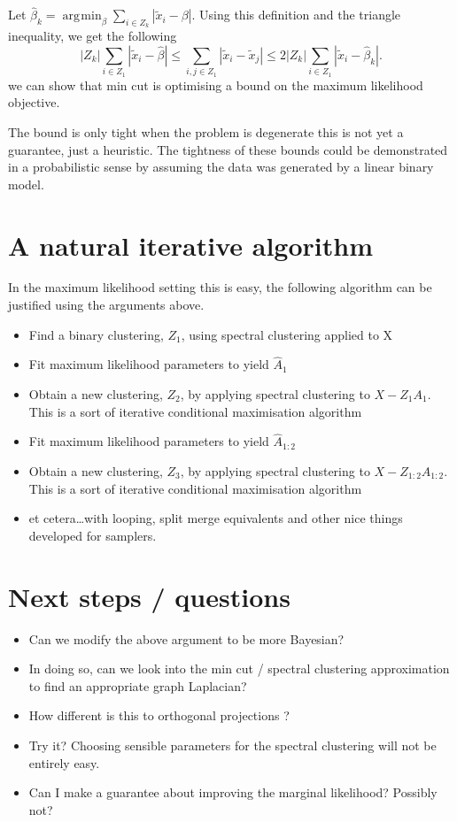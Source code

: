 \documentclass{article}
\numberwithin{equation}{section}
\numberwithin{thm}{section}
\def\IBP{Z}
\def\Weights{A}
\def\Data{X}
\DeclareMathOperator*{\argmin}{\arg\!\min}
\begin{document}
Let $\hat\beta_k = \argmin_\beta \sum_{i \in \IBP_k}|\tilde x_i - \beta|$. Using this definition and the triangle inequality, we get the following
\begin{equation}
|\IBP_k|\sum_{i \in \IBP_1}|\tilde x_i - \hat\beta| \leq \sum_{i,j \in \IBP_1}|\tilde x_i - \tilde x_j| \leq 2|\IBP_k|\sum_{i \in \IBP_1}|\tilde x_i - \hat\beta_k|.
\end{equation}
\ie we can show that min cut is optimising a bound on the maximum likelihood objective.

The bound is only tight when the problem is degenerate \ie this is not yet a guarantee, just a heuristic.
The tightness of these bounds could be demonstrated in a probabilistic sense by assuming the data was generated by a linear binary model.

\section{A natural iterative algorithm}

In the maximum likelihood setting this is easy, the following algorithm can be justified using the arguments above.
\begin{itemize}
\item Find a binary clustering, $\IBP_1$, using spectral clustering applied to \Data
\item Fit maximum likelihood parameters to yield $\hat\Weights_1$
\item Obtain a new clustering, $\IBP_2$, by applying spectral clustering to $\Data - \IBP_1\Weights_1$. This is a sort of iterative conditional maximisation algorithm
\item Fit maximum likelihood parameters to yield $\hat\Weights_{1:2}$
\item Obtain a new clustering, $\IBP_{3}$, by applying spectral clustering to $\Data - \IBP_{1:2}\Weights_{1:2}$. This is a sort of iterative conditional maximisation algorithm
\item et cetera\ldots with looping, split merge equivalents and other nice things developed for samplers.
\end{itemize}

\section{Next steps / questions}
\begin{itemize}
\item Can we modify the above argument to be more Bayesian?
\item In doing so, can we look into the min cut / spectral clustering approximation to find an appropriate graph Laplacian?
\item How different is this to orthogonal projections \citep{Cui2007}?
\item Try it? Choosing sensible parameters for the spectral clustering will not be entirely easy.
\item Can I make a guarantee about improving the marginal likelihood? Possibly not?
\end{itemize}
\end{document}
